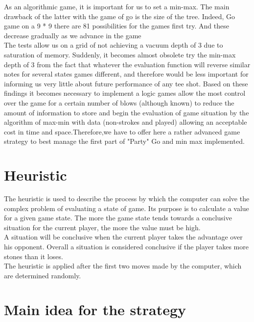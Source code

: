 \documentclass{report}
\begin{document}
As an algorithmic game, it is important for us to set a min-max. The
main drawback of the latter with the game of go is the size of the tree. Indeed,
Go game on a 9 * 9 there are 81 possibilities for the games first try. And these
decrease gradually as we advance in the game\\
The tests allow us on a grid of not achieving a vacuum
depth of 3 due to saturation of memory. Suddenly, it becomes almost
obsolete try the min-max depth of 3 from the fact that whatever the
evaluation function will reverse similar notes for several states games
different, and therefore would be less important for informing us very little about
future performance of any tee shot.
Based on these findings it becomes necessary to implement a logic games
allow the most control over the game for a certain number of blows (although
known) to reduce the amount of information to store and begin the evaluation of
game situation by the algorithm of max-min with data (non-strokes and played)
allowing an acceptable cost in time and space.Therefore,we have to offer here
a rather advanced game strategy to best manage the first part of
"Party" Go and min max implemented.\\


\section{Heuristic}



The heuristic is used to describe the process by which the computer can solve the complex problem of evaluating a state of game.
Its purpose is to calculate a value for a given game state. The more the game state tends towards a conclusive situation for the current player, the more the value must be high.\\

A situation will be conclusive when the current player takes the advantage over his opponent.
Overall a situation is considered conclusive if the player takes more stones than it loses.\\

The heuristic is applied after the first two moves made by the computer, which are determined randomly.\\
\newpage

\section {Main idea for the strategy}
\end{document}

